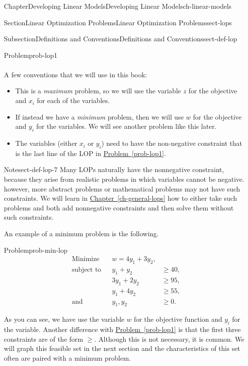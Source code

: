\documentclass[oneside,10pt,]{book}
\newcommand{\xreffont}{\relax}
\numberwithin{equation}{section}
\newcommand{\amp}{&}
\begin{document}
\begin{chapterptx}{Chapter}{Developing Linear Models}{}{Developing Linear Models}{}{}{ch-linear-models}
\begin{sectionptx}{Section}{Linear Optimization Problems}{}{Linear Optimization Problems}{}{}{sect-lops}
\begin{subsectionptx}{Subsection}{Definitions and Conventions}{}{Definitions and Conventions}{}{}{sect-def-lop}
\begin{problem}{Problem}{}{prob-lop1}
\begin{equation*}
\begin{aligned}
\end{aligned}
\end{equation*}
%
\end{problem}
A few conventions that we will use in this book:%
\par
%
\begin{itemize}[label=\textbullet]
\item{}This is a \emph{maximum} problem, so we will use the variable \(z\) for the objective and \(x_i\) for each of the variables.%
\item{}If instead we have a \emph{minimum} problem, then we will use \(w\) for the objective and \(y_i\) for the variables. We will see another problem like this later.%
\item{}The variables (either \(x_i\) or \(y_i\)) need to have the non-negative constraint that is the last line of the LOP in \hyperref[prob-lop1]{Problem~{\xreffont\ref{prob-lop1}}}.%
\end{itemize}
%
\begin{note}{Note}{}{sect-def-lop-7}%
Many LOPs naturally have the nonnegative constraint, because they arise from realistic problems in which variables cannot be negative. however, more abstract problems or mathematical problems may not have such constraints. We will learn in \hyperref[ch-general-lops]{Chapter~{\xreffont\ref{ch-general-lops}}} how to either take such problems and both add nonnegative constraints and then solve them without such constraints.%
\end{note}
An example of a minimum problem is the following.%
\begin{problem}{Problem}{}{prob-min-lop}%
%
\begin{equation*}
\begin{aligned} \text{Minimize} \amp \amp w = 4y_1 + 3y_2, \amp \\ \text{subject to} \amp \amp y_1 + y_2 \amp \geq 40, \\ \amp \amp 3y_1 + 2y_2 \amp \geq 95, \\ \amp \amp y_1 + 4 y_2 \amp \geq 55, \\ \text{and} \amp \amp y_1, y_2 \amp \geq 0.
\end{aligned}
\end{equation*}
%
\end{problem}
As you can see, we have use the variable \(w\) for the objective function and \(y_i\) for the variable. Another difference with \hyperref[prob-lop1]{Problem~{\xreffont\ref{prob-lop1}}} is that the first three constraints are of the form \(\geq\). Although this is not necessary, it is common. We will graph this feasible set in the next section and the characteristics of this set often are paired with a minimum problem.%

\end{subsectionptx}
\end{sectionptx}
\end{chapterptx}
\end{document}
